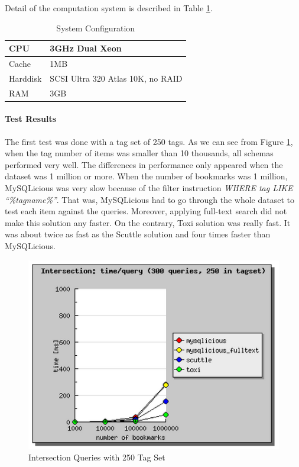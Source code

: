 Detail of the computation system is described in Table \ref{tb:systemconf}.

\begin{table}[!ht]
\centering
\caption{System Configuration}\label{tb:systemconf}
\begin{tabular}{| l | l |} \hline
CPU & 3GHz Dual Xeon\\ \hline
Cache & 1MB\\ \hline
Harddisk & SCSI Ultra 320 Atlas 10K, no RAID\\ \hline
RAM & 3GB\\ \hline
\end{tabular}
\end{table}

\paragraph{Test Results}

The first test was done with a tag set of 250 tags. As we can see from Figure \ref{fg:intersection250}, when  the tag number of items was smaller than 10 thousands, all schemas performed very well. The differences in performance only appeared when the dataset was 1 million or more. When the number of bookmarks was 1 million, MySQLicious was very slow because of the filter instruction \textit{WHERE tag LIKE ``\%tagname\%''}. That was, MySQLicious had to go through the whole dataset to test each item against the queries. Moreover, applying full-text search did not make this solution any faster. On the contrary, Toxi solution was really fast. It was about twice as fast as the Scuttle solution and four times faster than MySQLicious.

\begin{figure}[!h]
\begin{centering}
\includegraphics[scale=0.8]{pics/intersection250}
\caption{Intersection Queries with 250 Tag Set}\label{fg:intersection250}
\end{centering}
\end{figure}

